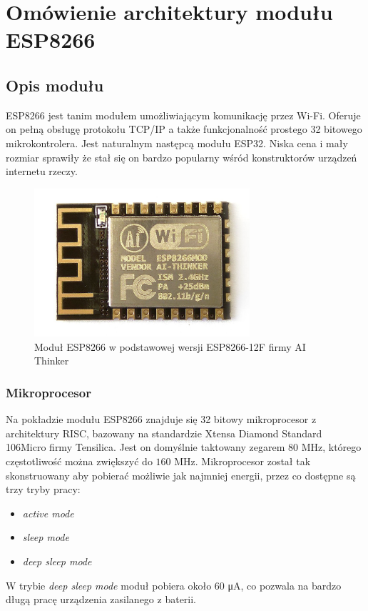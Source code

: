 \chapter{Omówienie architektury modułu ESP8266}
\label{omowienie_arch}

\section{Opis modułu}
\label{opis_modulu}

ESP8266 jest tanim modułem umożliwiającym komunikację przez Wi-Fi.
Oferuje on pełną obsługę protokołu TCP/IP a także funkcjonalność prostego
32 bitowego mikrokontrolera. Jest naturalnym następcą modułu ESP32. Niska cena 
i mały rozmiar sprawiły że stał się on bardzo popularny wśród konstruktorów 
urządzeń internetu rzeczy.\\

\begin{figure}[H]
	\centering
    \includegraphics[width=8cm]{./images/esp8266.jpg}
    \caption{Moduł ESP8266 w podstawowej wersji ESP8266-12F firmy AI Thinker}
	\label{esp8266}
\end{figure}

\subsection{Mikroprocesor}
\label{mikroprocesor}

Na pokładzie modułu ESP8266 znajduje się 32 bitowy mikroprocesor z architektury RISC, 
bazowany na standardzie Xtensa Diamond Standard 106Micro firmy Tensilica.
Jest on domyślnie taktowany zegarem $\num{80}$ MHz, którego częstotliwość można 
zwiększyć do $\num{160}$ MHz. Mikroprocesor został tak skonstruowany aby pobierać 
możliwie jak najmniej energii, przez co dostępne są trzy tryby pracy:
\begin{itemize}
    \item \textit{active mode} 
    \item \textit{sleep mode}
    \item \textit{deep sleep mode}
\end{itemize}
W trybie \textit{deep sleep mode} moduł pobiera około $\num{60}$ \si{\micro A}, co pozwala
na bardzo długą pracę urządzenia zasilanego z baterii.


